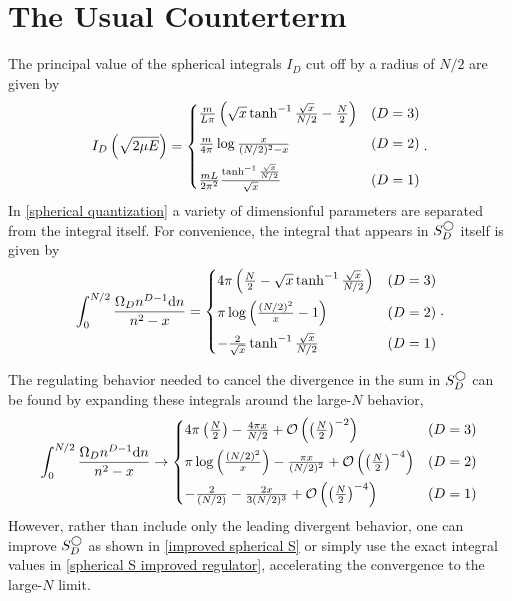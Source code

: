 \section{The Usual Counterterm}\label{sec:counterterm/spherical}

The principal value of the spherical integrals $I_D$ cut off by a radius of $N/2$ are given by
\begin{equation}
    I_D\left(\sqrt{2\mu E}\right) = \begin{cases}
        \frac{m}{L\pi}\left(\sqrt{x}\tanh^{-1}\frac{\sqrt{x}}{N/2} - \frac{N}{2}\right)
            &   (D=3)\\[0.25cm]
        \frac{m}{4\pi} \log \frac{x}{(N/2)^2-x}
            &   (D=2)\\[0.25cm]
        \frac{m L}{2\pi^2} \frac{\tanh^{-1} \frac{\sqrt{x}}{N/2}}{\sqrt{x}}                     &   (D=1)
    \end{cases}.
\end{equation}
In \eqref{spherical quantization} a variety of dimensionful parameters are separated from the integral itself.  For convenience, the integral that appears in $S_D^\bigcirc$ itself is given by
\begin{equation}
    \label{eq:spherical S improved regulator}
    \int_0^{N/2} \frac{\Omega_D n^{D-1} \mathrm{d}n}{n^2-x} = \begin{cases}
        4\pi\left( \frac{N}{2} - \sqrt{x} \tanh^{-1} \frac{\sqrt{x}}{N/2}\right)
            &   (D=3)\\[0.25cm]
        \pi \log\left( \frac{(N/2)^2}{x} - 1\right)
            &   (D=2)\\[0.25cm]
        -\frac{2}{\sqrt{x}} \tanh^{-1} \frac{\sqrt{x}}{N/2}                     &   (D=1)
    \end{cases}.
\end{equation}

The regulating behavior needed to cancel the divergence in the sum in $S_D^\bigcirc$ can be found by expanding these integrals around the large-$N$ behavior,
\begin{equation}
    \int_0^{N/2} \frac{\Omega_D n^{D-1} \mathrm{d}n}{n^2-x} \rightarrow \begin{cases}
        4\pi \left(\frac{N}{2}\right) - \frac{4 \pi x}{N/2} + \mathcal{O}\left(\left(\frac{N}{2}\right)^{-2}\right)
            &   (D=3)\\[0.25cm]
        \pi \log \left(\frac{(N/2)^2}{x}\right) - \frac{\pi x}{(N/2)^2} + \mathcal{O}\left(\left(\frac{N}{2}\right)^{-4}\right)
            &   (D=2)\\[0.25cm]
        -\frac{2}{(N/2)} - \frac{2 x}{3 (N/2)^3} + \mathcal{O}\left(\left(\frac{N}{2}\right)^{-4}\right)
            &   (D=1)
    \end{cases}
\end{equation}
However, rather than include only the leading divergent behavior, one can improve $S_D^\bigcirc$ as shown in \eqref{improved spherical S} or simply use the exact integral values in \eqref{spherical S improved regulator}, accelerating the convergence to the large-$N$ limit.

